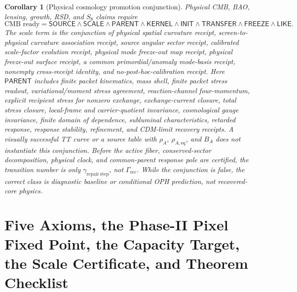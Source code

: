 \documentclass[11pt]{article}
\newtheorem{corollary}[theorem]{Corollary}
\begin{document}
\begin{corollary}[Physical cosmology promotion conjunction]
Physical CMB, BAO, lensing, growth, RSD, and \(S_8\) claims require
\[
\text{CMB ready}
=
\mathsf{SOURCE}\wedge
\mathsf{SCALE}\wedge
\mathsf{PARENT}\wedge
\mathsf{KERNEL}\wedge
\mathsf{INIT}\wedge
\mathsf{TRANSFER}\wedge
\mathsf{FREEZE}\wedge
\mathsf{LIKE}.
\]
The scale term is the conjunction of
\emph{physical spatial curvature receipt},
\emph{screen-to-physical curvature association receipt},
\emph{source angular sector receipt},
\emph{calibrated scale-factor evolution receipt},
\emph{physical mode freeze-out map receipt},
\emph{physical freeze-out surface receipt}, a common primordial/anomaly mode-basis receipt,
nonempty cross-receipt identity, and no-post-hoc-calibration receipt.
Here \(\mathsf{PARENT}\) includes finite packet kinematics, mass shell,
finite packet stress readout, variational/moment stress agreement,
reaction-channel four-momentum, explicit recipient stress for nonzero exchange,
exchange-current closure, total stress closure, local-frame and carrier-quotient
invariance, cosmological gauge invariance, finite domain of dependence,
subluminal characteristics, retarded response, response stability, refinement,
and CDM-limit recovery receipts.  A visually successful TT curve or a source
table with \(\rho_A\), \(\rho_{A,\mathrm{eq}}\), and \(B_A\) does not
instantiate this conjunction.  Before the active fiber, conserved-sector
decomposition, physical clock, and common-parent response pole are certified,
the transition number is only \(\gamma_{\mathrm{repair\ step}}\), not
\(\Gamma_{\mathrm{rec}}\).  While the conjunction is false, the correct class is
diagnostic baseline or conditional OPH prediction, not recovered-core physics.
\end{corollary}
\section{Five Axioms, the Phase-II Pixel Fixed Point, the Capacity Target, the Scale Certificate, and Theorem Checklist}\label{sec:theorem-ledger}
\end{document}
